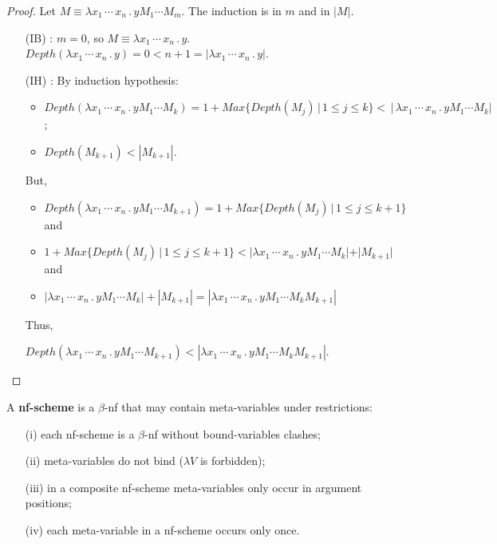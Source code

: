 \documentclass[a4paper,10pt]{article}
\begin{document}
\begin{proof}
  Let $M \equiv \lambda x_1\, \cdots \, x_n\, . \, y M_1 \cdots M_m$. The induction is in $m$ and in $|M|$.

\begin{itemize}
 \item[(IB)] :  $m=0$, so  $M \equiv \lambda x_1\, \cdots \, x_n\, . \, y$. 
 $Depth(\lambda x_1\, \cdots \, x_n\, . \, y) = 0 < n+1 =|\lambda x_1\, \cdots \, x_n\, . \, y|$.
 
 \item[(IH)] : By induction hypothesis:
        \begin{itemize}
         \item $Depth(\lambda x_1\, \cdots \, x_n\, . \, y M_1 \cdots M_k) = 1+ Max\{Depth(M_j) \,|\,1 \leq j \leq k\} < \,|\,\lambda x_1\, \cdots \, x_n\, . \, y M_1 \cdots M_k|$;
         \item $Depth(M_{k+1}) < |M_{k+1}|$.
        \end{itemize}

But, \begin{itemize}
       \item $Depth(\lambda x_1\, \cdots \, x_n\, . \, y M_1 \cdots M_{k+1}) = 1+ Max\{Depth(M_j)\,|\,1 \leq j \leq k+1\}$ and
       \item $1+ Max\{Depth(M_j)\,|\,1 \leq j \leq k+1\} < |\lambda x_1\, \cdots \, x_n\, . \, y M_1\cdots M_k| + |M_{k+1}|$ and
       \item $|\lambda x_1\, \cdots \, x_n\, . \, y M_1\cdots M_k| + |M_{k+1}| = |\lambda x_1\, \cdots \, x_n\, . \, y M_1 \cdots M_k M_{k+1}|$
     \end{itemize}
     

Thus, 

$Depth(\lambda x_1\, \cdots \, x_n\, . \, y M_1 \cdots M_{k+1})  < |\lambda x_1\, \cdots \, x_n\, . \, y M_1 \cdots M_k M_{k+1}|$.    
        
\end{itemize}
\end{proof}


\begin{mydef}[nf-schemes]\label{8C1}
 A \textbf{nf-scheme} is a $\beta$-nf that may contain meta-variables under restrictions:
 \begin{itemize}
  \item[(i)] each nf-scheme is a $\beta$-nf without bound-variables clashes;
  \item[(ii)] meta-variables do not bind ($\lambda V$ is forbidden);
  \item[(iii)] in a composite nf-scheme meta-variables only occur in argument positions;
  \item[(iv)] each meta-variable in a nf-scheme occurs only once.
 \end{itemize}
\end{mydef}
\end{document}
